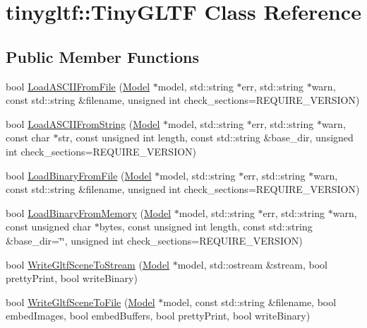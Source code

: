 \hypertarget{classtinygltf_1_1TinyGLTF}{}\section{tinygltf\+:\+:Tiny\+G\+L\+TF Class Reference}
\label{classtinygltf_1_1TinyGLTF}
\subsection*{Public Member Functions}
\begin{DoxyCompactItemize}
\item 
bool \hyperlink{classtinygltf_1_1TinyGLTF_afb694767274be3674f6e98ad2e32ffa8}{Load\+A\+S\+C\+I\+I\+From\+File} (\hyperlink{classtinygltf_1_1Model}{Model} $\ast$model, std\+::string $\ast$err, std\+::string $\ast$warn, const std\+::string \&filename, unsigned int check\+\_\+sections=R\+E\+Q\+U\+I\+R\+E\+\_\+\+V\+E\+R\+S\+I\+ON)
\item 
bool \hyperlink{classtinygltf_1_1TinyGLTF_a868ceaa7231473720375cfe47ba26840}{Load\+A\+S\+C\+I\+I\+From\+String} (\hyperlink{classtinygltf_1_1Model}{Model} $\ast$model, std\+::string $\ast$err, std\+::string $\ast$warn, const char $\ast$str, const unsigned int length, const std\+::string \&base\+\_\+dir, unsigned int check\+\_\+sections=R\+E\+Q\+U\+I\+R\+E\+\_\+\+V\+E\+R\+S\+I\+ON)
\item 
bool \hyperlink{classtinygltf_1_1TinyGLTF_a6fcc0f27b3973a1a0c1afe39f7c52c51}{Load\+Binary\+From\+File} (\hyperlink{classtinygltf_1_1Model}{Model} $\ast$model, std\+::string $\ast$err, std\+::string $\ast$warn, const std\+::string \&filename, unsigned int check\+\_\+sections=R\+E\+Q\+U\+I\+R\+E\+\_\+\+V\+E\+R\+S\+I\+ON)
\item 
bool \hyperlink{classtinygltf_1_1TinyGLTF_a363def44f18e944fa49e0cebe8f1b5b6}{Load\+Binary\+From\+Memory} (\hyperlink{classtinygltf_1_1Model}{Model} $\ast$model, std\+::string $\ast$err, std\+::string $\ast$warn, const unsigned char $\ast$bytes, const unsigned int length, const std\+::string \&base\+\_\+dir=\char`\"{}\char`\"{}, unsigned int check\+\_\+sections=R\+E\+Q\+U\+I\+R\+E\+\_\+\+V\+E\+R\+S\+I\+ON)
\item 
bool \hyperlink{classtinygltf_1_1TinyGLTF_aa219527a19b8c2d72821f6a6a91651dc}{Write\+Gltf\+Scene\+To\+Stream} (\hyperlink{classtinygltf_1_1Model}{Model} $\ast$model, std\+::ostream \&stream, bool pretty\+Print, bool write\+Binary)
\item 
bool \hyperlink{classtinygltf_1_1TinyGLTF_a3b0f37da7e370ba71b8b3269e491f325}{Write\+Gltf\+Scene\+To\+File} (\hyperlink{classtinygltf_1_1Model}{Model} $\ast$model, const std\+::string \&filename, bool embed\+Images, bool embed\+Buffers, bool pretty\+Print, bool write\+Binary)

\end{DoxyCompactItemize}

